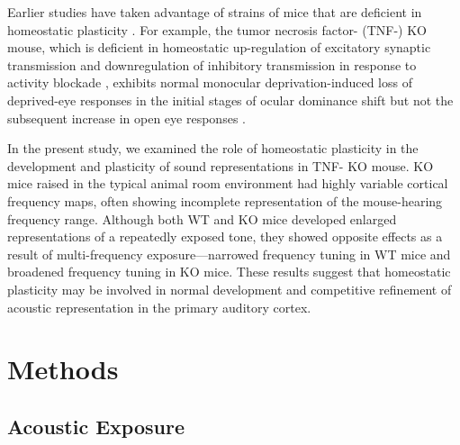 Earlier studies have taken advantage of strains of mice that are deficient in homeostatic plasticity \cite{Kaneko2008, Ranson2012}. For example, the tumor necrosis factor-\textalpha{} (TNF-\textalpha{}) KO mouse, which is deficient in homeostatic up-regulation of excitatory synaptic transmission and downregulation of inhibitory transmission in response to activity blockade \cite{Stellwagen2006, Kaneko2008}, exhibits normal monocular deprivation-induced loss of deprived-eye responses in the initial stages of ocular dominance shift but not the subsequent increase in open eye responses \cite{Kaneko2008}.

In the present study, we examined the role of homeostatic plasticity in the development and plasticity of sound representations in TNF-\textalpha{} KO mouse. KO mice raised in the typical animal room environment had highly variable cortical frequency maps, often showing incomplete representation of the mouse-hearing frequency range. Although both WT and KO mice developed enlarged representations of a repeatedly exposed tone, they showed opposite effects as a result of multi-frequency exposure---narrowed frequency tuning in WT mice and broadened frequency tuning in KO mice. These results suggest that homeostatic plasticity may be involved in normal development and competitive refinement of acoustic representation in the primary auditory cortex.

\section{Methods}

\subsection{Acoustic Exposure}

